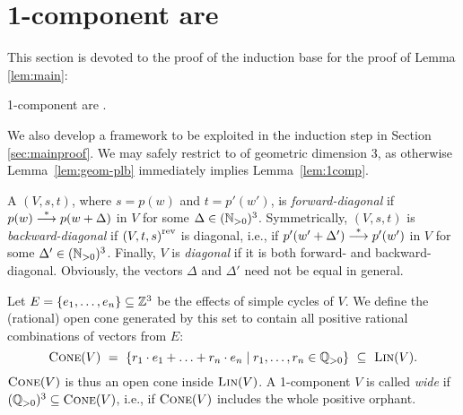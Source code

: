 
\section{1-component \tvass are \plb} \label{sec:1comp}

This section is devoted to the proof of the 
induction base for the proof of Lemma \ref{lem:main}:

\begin{lemma} \label{lem:1comp}
1-component \tvass are \plb.
\end{lemma}

\noindent
We also develop a framework to be exploited in the induction step in 
Section \ref{sec:mainproof}.
We may safely restrict to \tvass of geometric dimension 3,
as otherwise Lemma~\ref{lem:geom-plb} immediately implies Lemma~\ref{lem:1comp}.

A \tvass $(V, s, t)$, where $s=p(w)$ and $t=p'(w')$,
is \emph{forward-diagonal} if
$p(w) \stackrel{*}{\longrightarrow} p(w+\Delta)$ in $V$ for some $\Delta \in (\mathbb{N}_{>0})^3$.
Symmetrically, $(V, s, t)$ is \emph{backward-diagonal} if ${(V, t, s)}^{\text{rev}}$ is diagonal, i.e., if 
$p'(w'+\Delta') \stackrel{*}{\longrightarrow} p'(w')$ in $V$ for some $\Delta' \in (\mathbb{N}_{>0})^3$.
Finally, $V$ is \emph{diagonal} if it is both forward- and backward-diagonal.
Obviously, the vectors $\Delta$ and $\Delta'$ need not be equal in general.


Let  $E=\{e_1, \ldots, e_n\} \subseteq \mathbb{Z}^3$ be the effects of simple cycles of $V$.
We define the (rational) open cone generated by this set
to contain all positive rational combinations of vectors from $E$:
\[
\textsc{Cone}(V) \ = \ \{ r_1 \cdot e_1 + \ldots + r_n \cdot e_n  \mid r_1, \ldots, r_n \in \mathbb{Q}_{>0}\} \ \subseteq \ \textsc{Lin}(V).
\]
$\textsc{Cone}(V)$ is thus an open cone inside $\textsc{Lin}(V)$.
A 1-component \tvass $V$ is called \emph{wide} if $(\mathbb{Q}_{>0})^3 \subseteq \textsc{Cone}(V)$, i.e.,
if $\textsc{Cone}(V)$ includes the whole positive orphant.

%



